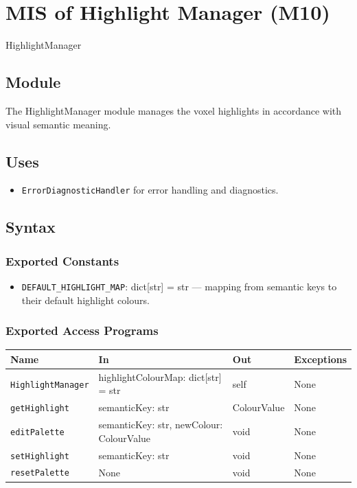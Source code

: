\documentclass[12pt, titlepage]{article}
\begin{document}
\section{MIS of Highlight Manager (M10)}\label{Module13} 

HighlightManager

\subsection{Module}
The HighlightManager module manages the voxel highlights in accordance with visual semantic meaning.

\subsection{Uses}
\begin{itemize}
  \item \texttt{ErrorDiagnosticHandler} for error handling and diagnostics.
\end{itemize}

\subsection{Syntax}

\subsubsection{Exported Constants}

\begin{itemize}
  \item \texttt{DEFAULT\_HIGHLIGHT\_MAP}: dict[str] = str — mapping from semantic keys to their default highlight colours.
\end{itemize}

\subsubsection{Exported Access Programs}

\begin{center}
\renewcommand{\arraystretch}{1.55}
\begin{tabular}{p{4cm} p{5cm} p{3cm} p{3cm}}
\hline
\textbf{Name} & \textbf{In} & \textbf{Out} & \textbf{Exceptions} \\
\hline

\texttt{HighlightManager} &
highlightColourMap: dict[str] = str &
self &
None \\

\texttt{getHighlight} &
semanticKey: str &
ColourValue &
None \\

\texttt{editPalette} &
semanticKey: str, \newline
newColour: ColourValue &
void &
None \\

\texttt{setHighlight} &
semanticKey: str &
void &
None \\

\texttt{resetPalette} &
None &
void &
None \\

\end{tabular}
\end{center}
\end{document}
